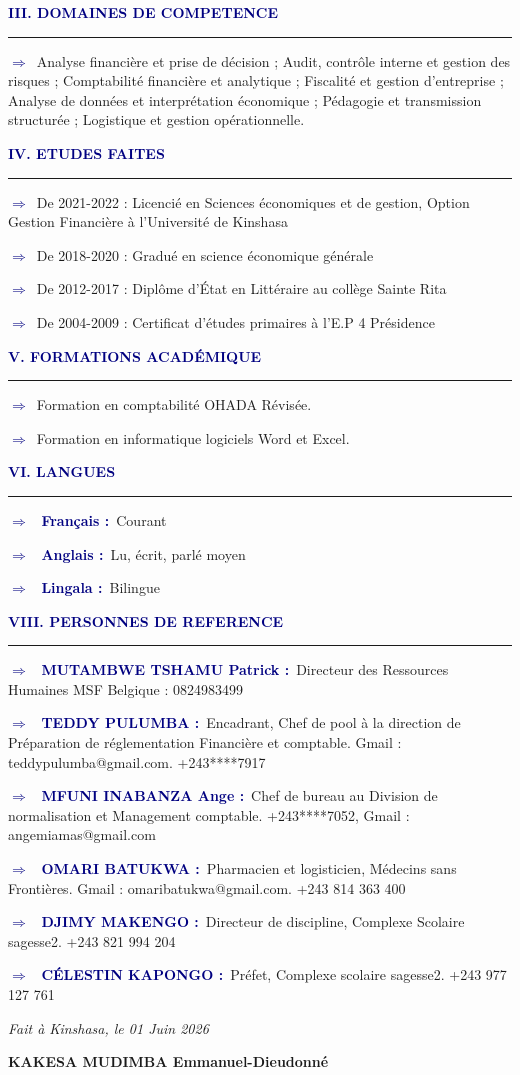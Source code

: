\documentclass[11pt,a4paper]{article}
\newcommand{\sectioncv}[1]{%
  \vspace{6pt}%
  \noindent\textcolor{navy}{\textbf{\large #1}}%
  \par\noindent\textcolor{navy}{\rule{\linewidth}{0.6pt}}%
  \vspace{2pt}%
}
\newcommand{\puce}[1]{%
  \noindent\textcolor{navy}{\textbf{\Large\ensuremath{\Rightarrow}}}~#1\par%
}
\newcommand{\ligne}[2]{%
  \noindent\textcolor{navy}{\textbf{\Large\ensuremath{\Rightarrow}}}~%
  \textcolor{navy}{\textbf{#1 :}}~#2\par%
}
\begin{document}
\sectioncv{III. DOMAINES DE COMPETENCE}
\puce{Analyse financi\`ere et prise de d\'ecision ; Audit, contr\^ole interne et
gestion des risques ; Comptabilit\'e financi\`ere et analytique ; Fiscalit\'e et
gestion d'entreprise ; Analyse de donn\'ees et interpr\'etation \'economique ;
P\'edagogie et transmission structur\'ee ; Logistique et gestion op\'erationnelle.}

\sectioncv{IV. ETUDES FAITES}
\puce{De 2021-2022 : Licenci\'e en Sciences \'economiques et de gestion, Option
Gestion Financi\`ere \`a l'Universit\'e de Kinshasa}
\puce{De 2018-2020 : Gradu\'e en science \'economique g\'en\'erale}
\puce{De 2012-2017 : Dipl\^ome d'\'Etat en Litt\'eraire au coll\`ege Sainte Rita}
\puce{De 2004-2009 : Certificat d'\'etudes primaires \`a l'E.P 4 Pr\'esidence}

\sectioncv{V. FORMATIONS ACAD\'EMIQUE}
\puce{Formation en comptabilit\'e OHADA R\'evis\'ee.}
\puce{Formation en informatique logiciels Word et Excel.}

\sectioncv{VI. LANGUES}
\ligne{Fran\c{c}ais}{Courant}
\ligne{Anglais}{Lu, \'ecrit, parl\'e moyen}
\ligne{Lingala}{Bilingue}

\sectioncv{VIII. PERSONNES DE REFERENCE}
\ligne{MUTAMBWE TSHAMU Patrick}{Directeur des Ressources Humaines MSF Belgique : 0824983499}
\ligne{TEDDY PULUMBA}{Encadrant, Chef de pool \`a la direction de Pr\'eparation de
r\'eglementation Financi\`ere et comptable. Gmail : teddypulumba@gmail.com. +243****7917}
\ligne{MFUNI INABANZA Ange}{Chef de bureau au Division de normalisation et
Management comptable. +243****7052, Gmail : angemiamas@gmail.com}
\ligne{OMARI BATUKWA}{Pharmacien et logisticien, M\'edecins sans Fronti\`eres.
Gmail : omaribatukwa@gmail.com. +243 814 363 400}
\ligne{DJIMY MAKENGO}{Directeur de discipline, Complexe Scolaire sagesse2. +243 821 994 204}
\ligne{C\'ELESTIN KAPONGO}{Pr\'efet, Complexe scolaire sagesse2. +243 977 127 761}

\vspace{14pt}
\hfill\textit{Fait \`a Kinshasa, le 01 Juin 2026}\par
\hfill\textbf{KAKESA MUDIMBA Emmanuel-Dieudonn\'e}
\end{document}
